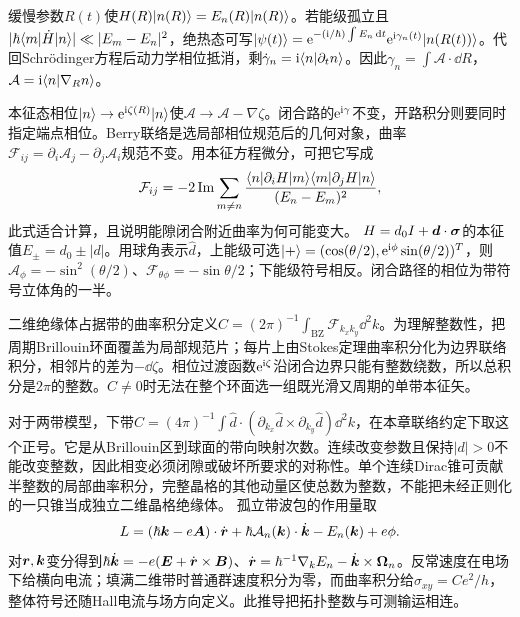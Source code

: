\label{ch:berry}
缓慢参数$R(t)$使$H(R)\lvert n(R)\rangle=E_n(R)\lvert n(R)\rangle$。若能级孤立且$|\hbar\langle m|\dot H|n\rangle|\ll|E_m-E_n|^2$，绝热态可写$\lvert \psi(t)\rangle=\mathrm e^{-(\mathrm i/\hbar)\int E_n\,\mathrm d t}\mathrm e^{\mathrm i\gamma_n(t)}\lvert n(R(t))\rangle$。代回Schrödinger方程后动力学相位抵消，剩$\dot\gamma_n=\mathrm i\langle n|\partial_t n\rangle$。因此$\gamma_n=\int\mathcal A\cdot\dd R$，$\mathcal A=\mathrm i\langle n|\nabla_Rn\rangle$。

本征态相位$\lvert n\rangle\to\mathrm e^{\mathrm i\zeta(R)}\lvert n\rangle$使$\mathcal A\to\mathcal A-\nabla\zeta$。闭合路的$\mathrm e^{\mathrm i\gamma}$不变，开路积分则要同时指定端点相位。Berry联络是选局部相位规范后的几何对象，曲率$\mathcal F_{ij}=\partial_i\mathcal A_j-\partial_j\mathcal A_i$规范不变。用本征方程微分，可把它写成
\begin{equation}
\mathcal F_{ij}=-2\operatorname{Im}\sum_{m\ne n}\frac{\langle n|\partial_iH|m\rangle\langle m|\partial_jH|n\rangle}{(E_n-E_m)^2},
\end{equation}
此式适合计算，且说明能隙闭合附近曲率为何可能变大。
$H=d_0I+\boldsymbol{d}\cdot\boldsymbol{\sigma}$的本征值$E_\pm=d_0\pm|d|$。用球角表示$\hat d$，上能级可选$\lvert +\rangle= (\cos(\theta/2),\mathrm e^{\mathrm i\phi}\sin(\theta/2))^T$，则$\mathcal A_\phi=-\sin^2(\theta/2)$、$\mathcal F_{\theta\phi}=-\sin\theta/2$；下能级符号相反。闭合路径的相位为带符号立体角的一半。

二维绝缘体占据带的曲率积分定义$C=(2\pi)^{-1}\int_{\mathrm{BZ}}\mathcal F_{k_xk_y}\dd^2k$。为理解整数性，把周期Brillouin环面覆盖为局部规范片；每片上由Stokes定理曲率积分化为边界联络积分，相邻片的差为$-\dd\zeta$。相位过渡函数$\mathrm e^{\mathrm i\zeta}$沿闭合边界只能有整数绕数，所以总积分是$2\pi$的整数。$C\ne0$时无法在整个环面选一组既光滑又周期的单带本征矢。

对于两带模型，下带$C=(4\pi)^{-1}\int\hat d\cdot(\partial_{k_x}\hat d\times\partial_{k_y}\hat d)\dd^2k$，在本章联络约定下取这个正号。它是从Brillouin区到球面的带向映射次数。连续改变参数且保持$|d|>0$不能改变整数，因此相变必须闭隙或破坏所要求的对称性。单个连续Dirac锥可贡献半整数的局部曲率积分，完整晶格的其他动量区使总数为整数，不能把未经正则化的一只锥当成独立二维晶格绝缘体。
孤立带波包的作用量取
\begin{equation}
L=(\hbar\boldsymbol{k}-e\boldsymbol{A})\cdot\dot{\boldsymbol{r}}+\hbar\mathcal A_n(\boldsymbol{k})\cdot\dot{\boldsymbol{k}}-E_n(\boldsymbol{k})+e\phi.
\end{equation}
对$\boldsymbol{r},\boldsymbol{k}$变分得到$\hbar\dot{\boldsymbol{k}}=-e(\boldsymbol{E}+\dot{\boldsymbol{r}}\times\boldsymbol{B})$、$\dot{\boldsymbol{r}}=\hbar^{-1}\nabla_kE_n-\dot{\boldsymbol{k}}\times\boldsymbol{\Omega}_n$。反常速度在电场下给横向电流；填满二维带时普通群速度积分为零，而曲率积分给$\sigma_{xy}=Ce^2/h$，整体符号还随Hall电流与场方向定义。此推导把拓扑整数与可测输运相连。

